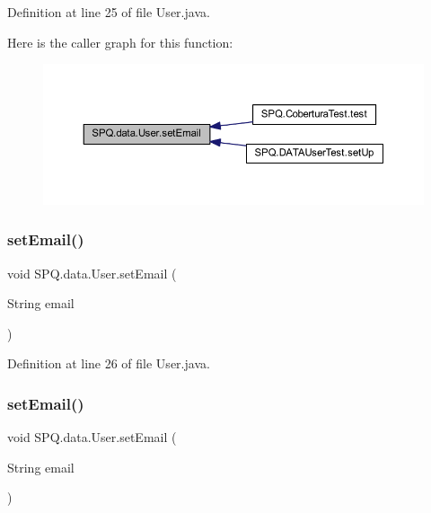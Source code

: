 Definition at line 25 of file User.\+java.

Here is the caller graph for this function\+:
\nopagebreak
\begin{figure}[H]
\begin{center}
\leavevmode
\includegraphics[width=350pt]{class_s_p_q_1_1data_1_1_user_ab7132f971882fb88afc6999cf5473ef4_icgraph}
\end{center}
\end{figure}
\mbox{\label{class_s_p_q_1_1data_1_1_user_ab7132f971882fb88afc6999cf5473ef4}} 
\subsubsection{\texorpdfstring{set\+Email()}{setEmail()}\hspace{0.1cm}{\footnotesize\ttfamily [3/4]}}
{\footnotesize\ttfamily void S\+P\+Q.\+data.\+User.\+set\+Email (\begin{DoxyParamCaption}\item[{String}]{email }\end{DoxyParamCaption})}



Definition at line 26 of file User.\+java.

\mbox{\label{class_s_p_q_1_1data_1_1_user_ab7132f971882fb88afc6999cf5473ef4}} 
\subsubsection{\texorpdfstring{set\+Email()}{setEmail()}\hspace{0.1cm}{\footnotesize\ttfamily [4/4]}}
{\footnotesize\ttfamily void S\+P\+Q.\+data.\+User.\+set\+Email (\begin{DoxyParamCaption}\item[{String}]{email }\end{DoxyParamCaption})}



